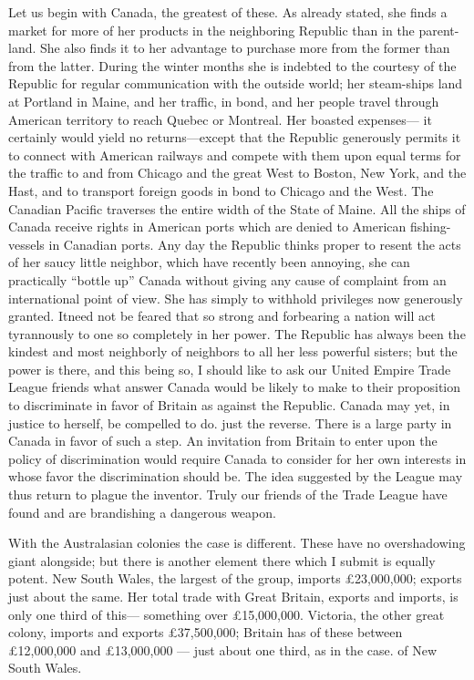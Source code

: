 \documentclass[11pt,openany]{book}
\begin{document}
Let us begin with Canada, the greatest of these. As already stated, she finds a market for more of her products in the neighboring Republic than in the parent-land. She also finds it to her advantage to purchase more from the former than from the latter. During the winter months she is indebted to the courtesy of the Republic for regular communication with the outside world; her steam-ships land at Portland in Maine, and her traffic, in bond, and her people travel through American territory to reach Quebec or Montreal. Her boasted expenses--- it certainly would yield no returns---except that the Republic generously permits it to connect with American railways and compete with them upon equal terms for the traffic to and from Chicago and the great West to Boston, New York, and the Hast, and to transport foreign goods in bond to Chicago and the West. The Canadian Pacific traverses the entire width of the State of Maine. All the ships of Canada receive rights in American ports which are denied to American fishing-vessels in Canadian ports. Any day the Republic thinks proper to resent the acts of her saucy little neighbor, which have recently been annoying, she can practically ``bottle up'' Canada without giving any cause of complaint from an international point of view. She has simply to withhold privileges now generously granted. Itneed not be feared that so strong and forbearing a nation will act tyrannously to one so completely in her power. The Republic has always been the kindest and most neighborly of neighbors to all her less powerful sisters; but the power is there, and this being so, I should like to ask our United Empire Trade League friends what answer Canada would be likely to make to their proposition to discriminate in favor of Britain as against the Republic. Canada may yet, in justice to herself, be compelled to do. just the reverse. There is a large party in Canada in favor of such a step. An invitation from Britain to enter upon the policy of discrimination would require Canada to consider for her own interests in whose favor the discrimination should be. The idea suggested by the League may thus return to plague the inventor. Truly our friends of the Trade League have found and are brandishing a dangerous weapon.

With the Australasian colonies the case is different. These have no overshadowing giant alongside; but there is another element there which I submit is equally potent. New South Wales, the largest of the group, imports £23,000,000; exports just about the same. Her total trade with Great Britain, exports and imports, is only one third of this--- something over £15,000,000. Victoria, the other great colony, imports and exports £37,500,000; Britain has of these between £12,000,000 and £13,000,000 --- just about one third, as in the case. of New South Wales.
\end{document}
